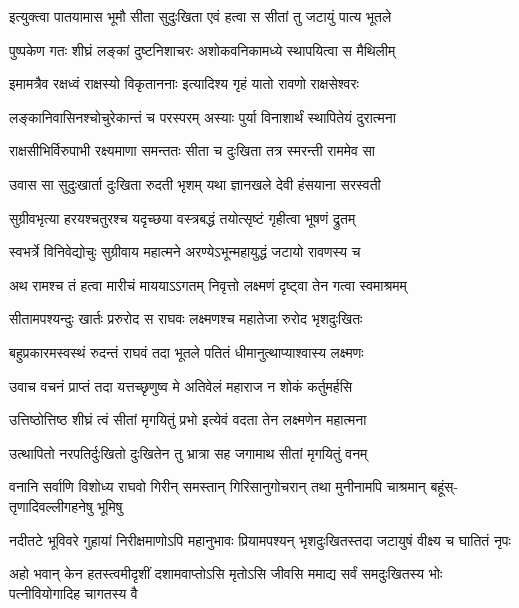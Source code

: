 \twolineshloka
{इत्युक्त्वा पातयामास भूमौ सीता सुदुःखिता}
{एवं हत्वा स सीतां तु जटायुं पात्य भूतले} %

\twolineshloka
{पुष्पकेण गतः शीघ्रं लङ्कां दुष्टनिशाचरः}
{अशोकवनिकामध्ये स्थापयित्वा स मैथिलीम्} %

\twolineshloka
{इमामत्रैव रक्षध्वं राक्षस्यो विकृताननाः}
{इत्यादिश्य गृहं यातो रावणो राक्षसेश्वरः} %

\twolineshloka
{लङ्कानिवासिनश्चोचुरेकान्तं च परस्परम्}
{अस्याः पुर्या विनाशार्थं स्थापितेयं दुरात्मना} %

\twolineshloka
{राक्षसीभिर्विरुपाभी रक्ष्यमाणा समन्ततः}
{सीता च दुःखिता तत्र स्मरन्ती राममेव सा} %

\twolineshloka
{उवास सा सुदुःखार्ता दुःखिता रुदती भृशम्}
{यथा ज्ञानखले देवी हंसयाना सरस्वती} %

\twolineshloka
{सुग्रीवभृत्या हरयश्चतुरश्च यदृच्छया}
{वस्त्रबद्धं तयोत्सृष्टं गृहीत्वा भूषणं द्रुतम्} %

\twolineshloka
{स्वभर्त्रे विनिवेद्योचुः सुग्रीवाय महात्मने}
{अरण्येऽभून्महायुद्धं जटायो रावणस्य च} %

\twolineshloka
{अथ रामश्च तं हत्वा मारीचं माययाऽऽगतम्}
{निवृत्तो लक्ष्मणं दृष्ट्वा तेन गत्वा स्वमाश्रमम्} %

\twolineshloka
{सीतामपश्यन्दुः खार्तः प्ररुरोद स राघवः}
{लक्ष्मणश्च महातेजा रुरोद भृशदुःखितः} %

\twolineshloka
{बहुप्रकारमस्वस्थं रुदन्तं राघवं तदा}
{भूतले पतितं धीमानुत्थाप्याश्वास्य लक्ष्मणः} %

\twolineshloka
{उवाच वचनं प्राप्तं तदा यत्तच्छृणुष्व मे}
{अतिवेलं महाराज न शोकं कर्तुमर्हसि} %

\twolineshloka
{उत्तिष्ठोत्तिष्ठ शीघ्रं त्वं सीतां मृगयितुं प्रभो}
{इत्येवं वदता तेन लक्ष्मणेन महात्मना} %

\twolineshloka
{उत्थापितो नरपतिर्दुःखितो दुःखितेन तु}
{भ्रात्रा सह जगामाथ सीतां मृगयितुं वनम्} %

\fourlineindentedshloka
{वनानि सर्वाणि विशोध्य राघवो}
{गिरीन् समस्तान् गिरिसानुगोचरान्}
{तथा मुनीनामपि चाश्रमान् बहूंस्-}
{तृणादिवल्लीगहनेषु भूमिषु} %

\fourlineindentedshloka
{नदीतटे भूविवरे गुहायां}
{निरीक्षमाणोऽपि महानुभावः}
{प्रियामपश्यन् भृशदुःखितस्तदा}
{जटायुषं वीक्ष्य च घातितं नृपः} %

\fourlineindentedshloka
{अहो भवान् केन हतस्त्वमीदृशीं}
{दशामवाप्तोऽसि मृतोऽसि जीवसि}
{ममाद्य सर्वं समदुःखितस्य भोः}
{पत्नीवियोगादिह चागतस्य वै} %

